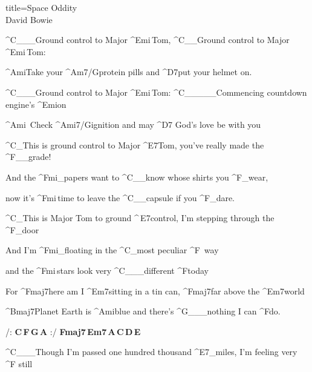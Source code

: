 \begin{song}{title=\predtitle\centering Space Oddity \\\large David Bowie  \vspace*{-0.3cm}}  %

\nejvetsi
\begin{centerjustified}

\sloka 
	^{C{\color{white}\_\_\_}}Ground control to Major ^{Emi\,}Tom, ^{C{\color{white}\_\_}}Ground control to Major ^{Emi\,}Tom:

	^{Ami}Take your ^{Am7/G}protein pills and ^{D7}put your helmet on.

	^{C{\color{white}\_\_\_}}Ground control to Major ^{Emi\,}Tom:  ^{C{\color{white}\_\_\_\_\_}}Commencing countdown engine's ^{Emi}on

	^{Ami\,\,\,}Check ^{Ami7/G}ignition and may ^{D7\,\,}God's love be with you

	^{C{\color{white}\_}}This is ground control to Major ^{E7}Tom, you've really made the ^{F{\color{white}\_\_}}grade!

	And the ^{Fmi{\color{white}\_}}papers want to ^{C}{\color{white}\_\_}know whose shirts you ^{F{\color{white}\_}}wear, 

	now it's ^{Fmi\,}time to leave the ^{C{\color{white}\_\_}}capsule if you ^{F{\color{white}\_}}dare.

	^{C{\color{white}\_}}This is Major Tom to ground ^{\,E7}control, I'm stepping through the ^{F{\color{white}\_}}door

	And I'm ^{Fmi{\color{white}\_}}floating in the ^{C{\color{white}\_}}most peculiar ^{F\,\,\,}way 

	and the ^{Fmi\,}stars look very ^{C{\color{white}\_\_\_}}different ^{F}today
       
	For ^{Fmaj7}here am I ^{Em7}sitting in a tin can, ^{Fmaj7}far above the ^{Em7}world

	^{Bmaj7}Planet Earth is ^{Ami}blue and there's ^{G{\color{white}\_\_\_}}nothing I can ^{F}do.

	\phantom{.}

	\phantom{.}

/: \textbf{C\,F\,G\,A} :/ \textbf{Fmaj7\,Em7\,A\,C\,D\,E}

\end{centerjustified}
\newpage
\begin{centerjustified}

\sloka
	^{C{\color{white}\_\_\_}}Though I'm passed one hundred thousand ^{E7{\color{white}\_}}miles, I'm feeling very ^{F\,\,}still


\end{centerjustified}
\end{song}
